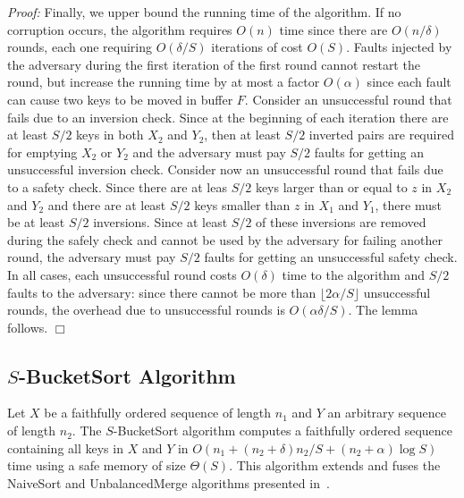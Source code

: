 \documentclass[review,number]{elsarticle}
\newcommand{\BO}[1]{{O}\left(#1\right)}
\newcommand{\BT}[1]{{\Theta}\left(#1\right)}
\renewenvironment{proof}{\begin{trivlist}
                         \item[] {\em Proof:}}{\hfill $\Box$
                       \end{trivlist}}
\newcommand{\X}{{X}}
\newcommand{\Y}{{Y}}
\newcommand{\SBucketSort}{$S$-\textsf{BucketSort}}
\newcommand{\NaiveSort}{\textsf{NaiveSort}}
\newcommand{\UnbalancedMerge}{\textsf{UnbalancedMerge}}
\begin{document}
\begin{proof}
Finally, we upper bound the running time of the algorithm.
If no corruption occurs, the algorithm requires $\BO{n}$ time since there are
$\BO{n/\delta}$ rounds, each one requiring $\BO{\delta/S}$ iterations of cost
$\BO{S}$. Faults injected by the adversary during the first iteration of
the first round cannot restart the round, but increase the running time by at
most a factor $\BO{\alpha}$ since each fault can cause two keys to be moved in
buffer $F$. Consider an unsuccessful round that fails due to an inversion check.
Since at the beginning of each iteration there are at least $S/2$ keys in both
$\X_2$ and $\Y_2$, then at least $S/2$ inverted pairs are required for emptying 
$\X_2$ or $\Y_2$ and the adversary must pay $S/2$ faults for getting an
unsuccessful inversion check. Consider now an unsuccessful round that fails due
to a safety check.  Since there are at leas $S/2$ keys larger than or equal to
$z$ in $\X_2$ and $\Y_2$ and there are at least $S/2$ keys smaller than $z$ in
$\X_1$ and $\Y_1$, there must be at least $S/2$ inversions. Since at least
$S/2$ of these inversions are removed during the safely check and cannot
be used by the adversary for failing another round,  the adversary
must pay  $S/2$ faults for getting an
unsuccessful safety check. In all cases, each unsuccessful round costs
$\BO{\delta}$ time to the algorithm and $S/2$ faults to the adversary: since
there cannot be more than $\lfloor 2\alpha /S\rfloor$ unsuccessful rounds, the
overhead due to unsuccessful rounds is $\BO{\alpha\delta/S}$. The lemma follows.
\end{proof}


\subsection[SBucketSort Algorithm]{\SBucketSort{} Algorithm}\label{sec:bucket}
Let $X$ be a faithfully ordered sequence of length $n_1$ and $Y$ an arbitrary
sequence of length $n_2$. The \SBucketSort{} algorithm computes a faithfully
ordered sequence containing all keys in $X$ and $Y$ in
$\BO{n_1+(n_2+\delta)n_2/S + (n_2+\alpha) \log S}$ time using a safe memory of
size $\BT{S}$. This algorithm extends and fuses the \NaiveSort{} and
\UnbalancedMerge{} algorithms presented in~\cite{FGI09}. 
\end{document}
